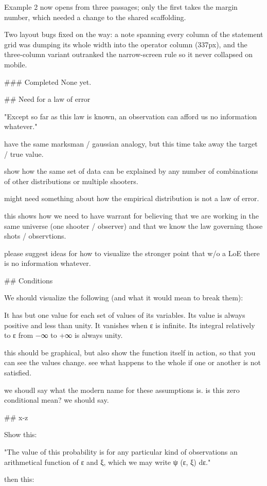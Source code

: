 Example 2 now opens from three passages; only the first takes the margin
number, which needed a change to the shared scaffolding.

Two layout bugs fixed on the way: a note spanning every column of the statement
grid was dumping its whole width into the operator column (337px), and the
three-column variant outranked the narrow-screen rule so it never collapsed on
mobile.

### Completed
None yet.

## Need for a law of error

"Except so far as this law is known, an observation can afford us no information whatever."

have the same marksman / gaussian analogy, but this time take away the target / true value. 

show how the same set of data can be explained by any number of combinations of other distributions or multiple shooters. 

might need something about how the empirical distribution is not a law of error. 

this shows how we need to have warrant for believing that we are working in the same universe (one shooter / observer)  and that we know the law governing those shots / observtions. 

please suggest ideas for how to visualize the stronger point that w/o a LoE there is no information whatever. 

## Conditions

We should visualize the following (and what it would mean to break them):

It has but one value for each set of values of its variables.
Its value is always positive and less than unity.
It vanishes when ε is infinite.
Its integral relatively to ε from −∞ to +∞ is always unity.

this should be graphical, but also show the function itself in action, so that you can see the values change. see what happens to the whole if one or another is not satisfied. 

we shoudl say what the modern name for these assumptions is. is this zero conditional mean? we should say. 

## x-z

Show this:

"The value of this probability is for any particular kind of observations an arithmetical function of ε and ξ, which we may write ψ (ε, ξ) dε."

then this:

